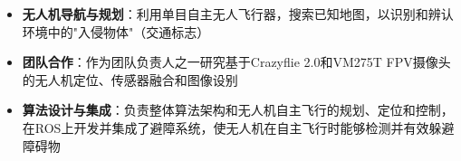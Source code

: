 
\begin{itemize}
\footnotesize
  \item \textbf{无人机导航与规划}：利用单目自主无人飞行器，搜索已知地图，以识别和辨认环境中的"入侵物体"（交通标志）
  \item \textbf{团队合作}：作为团队负责人之一研究基于Crazyflie 2.0和VM275T FPV摄像头的无人机定位、传感器融合和图像设别
  \item \textbf{算法设计与集成}：负责整体算法架构和无人机自主飞行的规划、定位和控制，在ROS上开发并集成了避障系统，使无人机在自主飞行时能够检测并有效躲避障碍物
\end{itemize}

